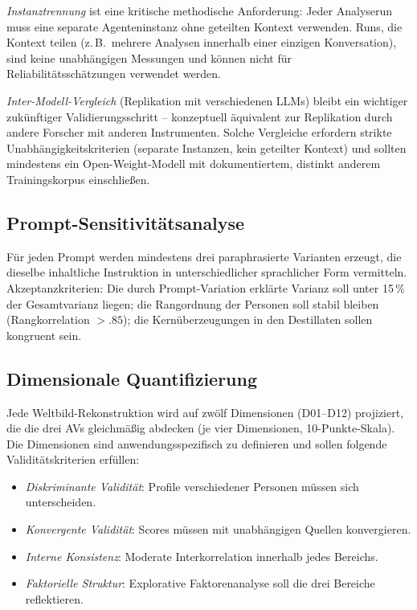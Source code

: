 \documentclass[11pt,a4paper]{article}
\theoremstyle{definition}
\theoremstyle{plain}
\theoremstyle{remark}
\begin{document}
\emph{Instanztrennung} ist eine kritische methodische Anforderung: Jeder Analyserun muss eine separate Agenteninstanz ohne geteilten Kontext verwenden. Runs, die Kontext teilen (z.\,B.\ mehrere Analysen innerhalb einer einzigen Konversation), sind keine unabh\"angigen Messungen und k\"onnen nicht f\"ur Reliabilit\"atssch\"atzungen verwendet werden.

\emph{Inter-Modell-Vergleich} (Replikation mit verschiedenen LLMs) bleibt ein wichtiger zuk\"unftiger Validierungsschritt -- konzeptuell \"aquivalent zur Replikation durch andere Forscher mit anderen Instrumenten. Solche Vergleiche erfordern strikte Unabh\"angigkeitskriterien (separate Instanzen, kein geteilter Kontext) und sollten mindestens ein Open-Weight-Modell mit dokumentiertem, distinkt anderem Trainingskorpus einschlie\ss{}en.

\subsection{Prompt-Sensitivit\"atsanalyse}
\label{sec:sensitivitaet}

F\"ur jeden Prompt werden mindestens drei paraphrasierte Varianten erzeugt, die dieselbe inhaltliche Instruktion in unterschiedlicher sprachlicher Form vermitteln. Akzeptanzkriterien: Die durch Prompt-Variation erkl\"arte Varianz soll unter 15\,\% der Gesamtvarianz liegen; die Rangordnung der Personen soll stabil bleiben (Rangkorrelation $> .85$); die Kern\"uberzeugungen in den Destillaten sollen kongruent sein.

\subsection{Dimensionale Quantifizierung}
\label{sec:dimensionen}

Jede Weltbild-Rekonstruktion wird auf zw\"olf Dimensionen (D01--D12) projiziert, die die drei AVs gleichm\"a\ss{}ig abdecken (je vier Dimensionen, 10-Punkte-Skala). Die Dimensionen sind anwendungsspezifisch zu definieren und sollen folgende Validit\"atskriterien erf\"ullen:

\begin{itemize}[leftmargin=*]
  \item \emph{Diskriminante Validit\"at}: Profile verschiedener Personen m\"ussen sich unterscheiden.
  \item \emph{Konvergente Validit\"at}: Scores m\"ussen mit unabh\"angigen Quellen konvergieren.
  \item \emph{Interne Konsistenz}: Moderate Interkorrelation innerhalb jedes Bereichs.
  \item \emph{Faktorielle Struktur}: Explorative Faktorenanalyse soll die drei Bereiche reflektieren.
\end{itemize}
\end{document}
